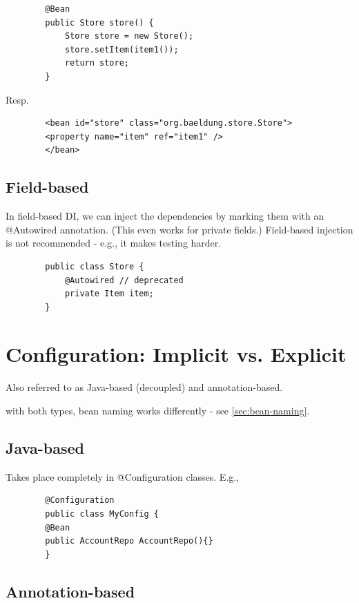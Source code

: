 \documentclass{scrartcl}
\begin{document}
    \begin{lstlisting}
        @Bean
        public Store store() {
            Store store = new Store();
            store.setItem(item1());
            return store;
        }
    \end{lstlisting}

    Resp.

    \begin{lstlisting}
        <bean id="store" class="org.baeldung.store.Store">
        <property name="item" ref="item1" />
        </bean>
    \end{lstlisting}

\subsection{Field-based}

    In field-based DI, we can inject the dependencies by marking them with an @Autowired annotation. (This even works for private fields.)
    Field-based injection is not recommended - e.g., it makes testing harder.

    \begin{lstlisting}
        public class Store {
            @Autowired // deprecated
            private Item item;
        }
    \end{lstlisting}


\section{Configuration: Implicit vs. Explicit}

    Also referred to as Java-based (decoupled) and annotation-based.

    with both types, bean naming works differently - see \ref{sec:bean-naming}.

\subsection{Java-based}

    Takes place completely in @Configuration classes. E.g.,

    \begin{lstlisting}
        @Configuration
        public class MyConfig {
        @Bean
        public AccountRepo AccountRepo(){}
        }
    \end{lstlisting}

\subsection{Annotation-based}
\end{document}

